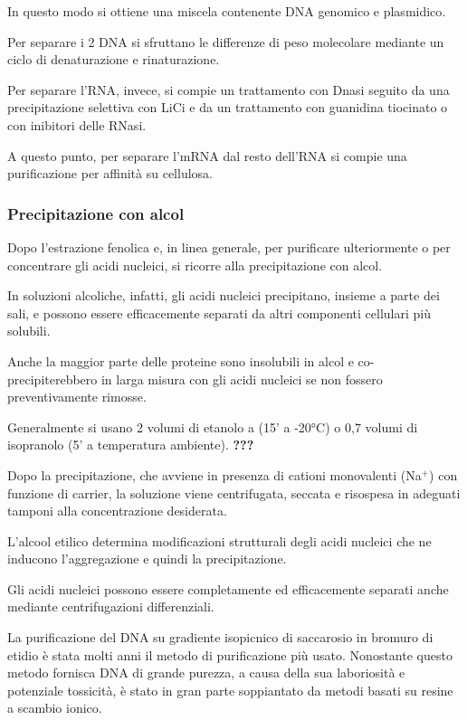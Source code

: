 \documentclass[]{article}
\begin{document}
In questo modo si ottiene una miscela contenente DNA genomico e
plasmidico.

Per separare i 2 DNA si sfruttano le differenze di peso molecolare
mediante un ciclo di denaturazione e rinaturazione.

Per separare l'RNA, invece, si compie un trattamento con Dnasi seguito
da una precipitazione selettiva con LiCi e da un trattamento con
guanidina tiocinato o con inibitori delle RNasi.

A questo punto, per separare l'mRNA dal resto dell'RNA si compie una
purificazione per affinità su cellulosa.

\subsubsection{Precipitazione con alcol}\label{precipitazione-con-alcol}

Dopo l'estrazione fenolica e, in linea generale, per purificare
ulteriormente o per concentrare gli acidi nucleici, si ricorre alla
precipitazione con alcol.

In soluzioni alcoliche, infatti, gli acidi nucleici precipitano, insieme
a parte dei sali, e possono essere efficacemente separati da altri
componenti cellulari più solubili.

Anche la maggior parte delle proteine sono insolubili in alcol e co-
precipiterebbero in larga misura con gli acidi nucleici se non fossero
preventivamente rimosse.

Generalmente si usano 2 volumi di etanolo a (15' a -20°C) o 0,7 volumi
di isopranolo (5' a temperatura ambiente). \textbf{???}

Dopo la precipitazione, che avviene in presenza di cationi monovalenti
(Na\(^+\)) con funzione di carrier, la soluzione viene centrifugata,
seccata e risospesa in adeguati tamponi alla concentrazione desiderata.

L'alcool etilico determina modificazioni strutturali degli acidi
nucleici che ne inducono l'aggregazione e quindi la precipitazione.

Gli acidi nucleici possono essere completamente ed efficacemente
separati anche mediante centrifugazioni differenziali.

La purificazione del DNA su gradiente isopicnico di saccarosio in
bromuro di etidio è stata molti anni il metodo di purificazione più
usato. Nonostante questo metodo fornisca DNA di grande purezza, a causa
della sua laboriosità e potenziale tossicità, è stato in gran parte
soppiantato da metodi basati su resine a scambio ionico.
\end{document}
